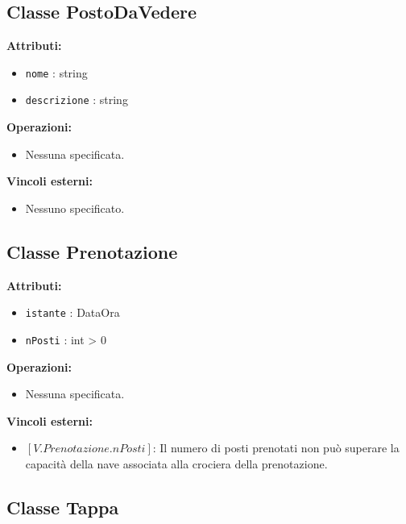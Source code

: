 \documentclass[a4paper]{scrartcl}
\begin{document}
\subsection{Classe PostoDaVedere}

\textbf{Attributi:}
\begin{itemize}
    \item \texttt{nome} : string
    \item \texttt{descrizione} : string
\end{itemize}

\textbf{Operazioni:}
\begin{itemize}
    \item Nessuna specificata.
\end{itemize}

\textbf{Vincoli esterni:}
\begin{itemize}
    \item Nessuno specificato.
\end{itemize}

\subsection{Classe Prenotazione}

\textbf{Attributi:}
\begin{itemize}
    \item \texttt{istante} : DataOra
    \item \texttt{nPosti} : int > 0
\end{itemize}

\textbf{Operazioni:}
\begin{itemize}
    \item Nessuna specificata.
\end{itemize}

\textbf{Vincoli esterni:}
\begin{itemize}
    \item $[V.Prenotazione.nPosti]$: Il numero di posti prenotati non può superare la capacità della nave associata alla crociera della prenotazione.
\end{itemize}

\subsection{Classe Tappa}
\end{document}
